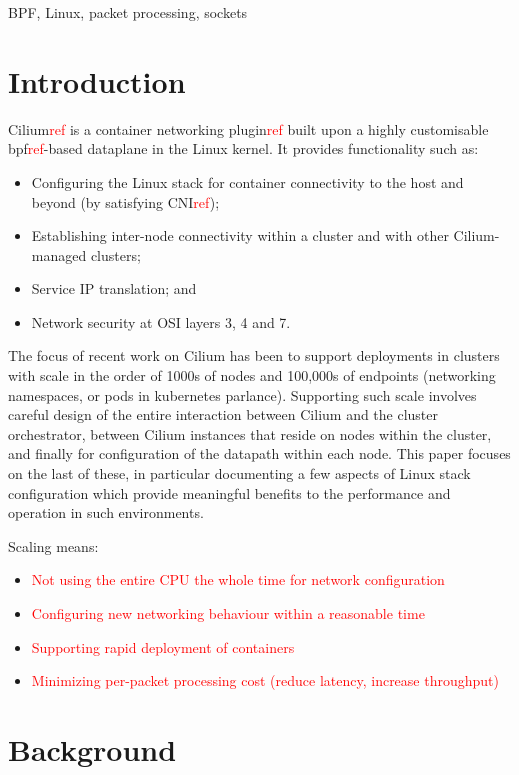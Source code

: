 \documentclass[10pt,sigconf,authorversion]{lpc}
\newcommand\todo[1]{\textcolor{red}{#1}}
\begin{document}
BPF, Linux, packet processing, sockets

\section{Introduction}

Cilium\todo{ref} is a container networking plugin\todo{ref} built upon a
highly customisable bpf\todo{ref}-based dataplane in the Linux kernel. It
provides functionality such as:

\begin{itemize}
    \item Configuring the Linux stack for container connectivity to the host
          and beyond (by satisfying CNI\todo{ref});
    \item Establishing inter-node connectivity within a cluster and with
          other Cilium-managed clusters;
    \item Service IP translation; and
    \item Network security at OSI layers 3, 4 and 7.
\end{itemize}

The focus of recent work on Cilium has been to support deployments in clusters
with scale in the order of 1000s of nodes and 100,000s of endpoints (networking
namespaces, or pods in kubernetes parlance). Supporting such scale involves
careful design of the entire interaction between Cilium and the cluster
orchestrator, between Cilium instances that reside on nodes within the cluster,
and finally for configuration of the datapath within each node. This paper
focuses on the last of these, in particular documenting a few aspects of Linux
stack configuration which provide meaningful benefits to the performance and
operation in such environments.

Scaling means:
\begin{itemize}
    \item \todo{Not using the entire CPU the whole time for network configuration}
    \item \todo{Configuring new networking behaviour within a reasonable time}
    \item \todo{Supporting rapid deployment of containers}
    \item \todo{Minimizing per-packet processing cost (reduce latency, increase throughput)}
\end{itemize}

\section{Background}
\end{document}
